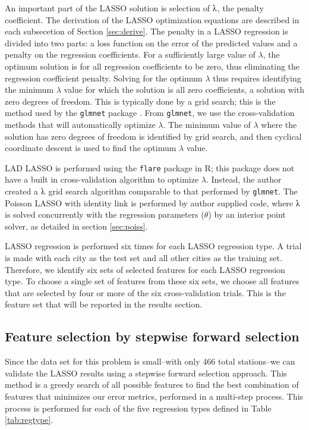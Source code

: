 \documentclass[11pt]{report}
\begin{document}
An important part of the LASSO solution is selection of $\lambdaup$, the penalty coefficient. The derivation of the LASSO optimization equations are described in each subsecetion of Section \ref{sec:derive}. The penalty in a LASSO regression is divided into two parts: a loss function on the error of the predicted values and a penalty on the regression coefficients. For a sufficiently large value of $\lambda$, the optimum solution is for all regression coefficients to be zero, thus eliminating the regression coefficient penalty. Solving for the optimum $\lambda$ thus requires identifying the minimum $\lambda$ value for which the solution is all zero coefficients, a solution with zero degrees of freedom. This is typically done by a grid search; this is the method used by the \texttt{glmnet} package \cite{friedman2010}. From \texttt{glmnet}, we use the cross-validation methods that will automatically optimize $\lambda$. The minimum value of $\lambda$ where the solution has zero degrees of freedom is identified by grid search, and then cyclical coordinate descent is used to find the optimum $\lambda$ value. 

LAD LASSO is performed using the \texttt{flare} package in R; this package does not have a built in cross-validation algorithm to optimize $\lambda$. Instead, the author created a $\lambdaup$ grid search algorithm comparable to that performed by \texttt{glmnet}. The Poisson LASSO with identity link is performed by author supplied code, where $\lambdaup$ is solved concurrently with the regression parameters ($\theta$) by an interior point solver, as detailed in section \ref{sec:poiss}.

LASSO regression is performed six times for each LASSO regression type. A trial is made with each city as the test set and all other cities as the training set. Therefore, we identify six sets of selected features for each LASSO regression type. To choose a single set of features from these six sets, we choose all features that are selected by four or more of the six cross-validation trials. This is the feature set that will be reported in the results section.

\subsection{Feature selection by stepwise forward selection}\label{sec:fs}
 
Since the data set for this problem is small--with only 466 total stations--we can validate the LASSO results using a stepwise forward selection approach. This method is a greedy search of all possible features to find the best combination of features that minimizes our error metrics, performed in a multi-step process. This process is performed for each of the five regression types defined in Table \ref{tab:regtype}. 
\end{document}
